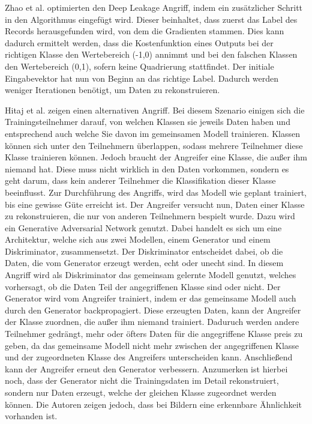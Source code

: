 Zhao et al. \cite{P-19} optimierten den Deep Leakage Angriff, indem ein zusätzlicher Schritt in den Algorithmus eingefügt wird.
Dieser beinhaltet, dass zuerst das Label des Records herausgefunden wird, von dem die Gradienten stammen.
Dies kann dadurch ermittelt werden, dass die Kostenfunktion eines Outputs bei der richtigen Klasse den Wertebereich (-1,0) annimmt und bei den falschen Klassen den Wertebereich (0,1), sofern keine Quadrierung stattfindet.
Der initiale Eingabevektor hat nun von Beginn an das richtige Label. 
Dadurch werden weniger Iterationen benötigt, um Daten zu rekonstruieren.


Hitaj et al. \cite{P-81} zeigen einen alternativen Angriff.
Bei diesem Szenario einigen sich die Trainingsteilnehmer darauf, von welchen Klassen sie jeweils Daten haben und entsprechend auch welche Sie davon im gemeinsamen Modell trainieren.
Klassen können sich unter den Teilnehmern überlappen, sodass mehrere Teilnehmer diese Klasse trainieren können.
Jedoch braucht der Angreifer eine Klasse, die außer ihm niemand hat.
Diese muss nicht wirklich in den Daten vorkommen, sondern es geht darum, dass kein anderer Teilnehmer die Klassifikation dieser Klasse beeinflusst.
Zur Durchführung des Angriffs, wird das Modell wie geplant trainiert, bis eine gewisse Güte erreicht ist.
Der Angreifer versucht nun, Daten einer Klasse zu rekonstruieren, die nur von anderen Teilnehmern bespielt wurde.
Dazu wird ein Generative Adversarial Network \cite{P-86} genutzt.
Dabei handelt es sich um eine Architektur, welche sich aus zwei Modellen, einem Generator und einem Diskriminator, zusammensetzt.
Der Diskriminator entscheidet dabei, ob die Daten, die vom Generator erzeugt werden, echt oder unecht sind. 
In diesem Angriff wird als Diskriminator das gemeinsam gelernte Modell genutzt, welches vorhersagt, ob die Daten Teil der angegriffenen Klasse sind oder nicht.
Der Generator wird vom Angreifer trainiert, indem er das gemeinsame Modell auch durch den Generator backpropagiert.
Diese erzeugten Daten, kann der Angreifer der Klasse zuordnen, die außer ihm niemand trainiert. 
Daduruch werden andere Teilnehmer gedrängt, mehr oder öfters Daten für die angegriffene Klasse preis zu geben, da das gemeinsame Modell nicht mehr zwischen der angegriffenen Klasse und der zugeordneten Klasse des Angreifers unterscheiden kann.
Anschließend kann der Angreifer erneut den Generator verbessern.
Anzumerken ist hierbei noch, dass der Generator nicht die Trainingsdaten im Detail rekonstruiert, sondern nur Daten erzeugt, welche der gleichen Klasse zugeordnet werden können.
Die Autoren zeigen jedoch, dass bei Bildern eine erkennbare Ähnlichkeit vorhanden ist.